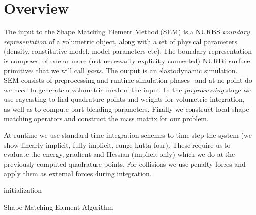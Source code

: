 \section{Overview}
The input to the Shape Matching Element Method (SEM)  is a NURBS \emph{boundary representation} of a volumetric object, along with a set of physical parameters 
(density, constitutive model, model parameters etc). 
The boundary representation is composed of one or more (not necessarily explicit;y connected) NURBS surface primitives that we will call \emph{parts}.
The output is an elastodynamic simulation. 
SEM consists of preprocessing and runtime simulation phases~ and at no point do we need to generate a volumetric mesh of the input. 
In the \emph{preprocessing} stage we use raycasting to find quadrature points and weights for volumetric integration, as well as to compute part blending parameters. 
Finally we construct local shape matching operators and construct the mass matrix for our problem. 

At runtime we use standard time integration schemes to time step the system (we show linearly implicit, fully implicit, runge-kutta four). 
These require us to evaluate the energy, gradient and Hessian (implicit only) which we do at the previously computed quadrature points. 
For collisions we use penalty forces and apply them as external forces during integration.

\begin{algorithm}[h]
    \label{alg:sem}
    \SetAlgoLined
     initialization\;
     \caption{Shape Matching Element Algorithm}
    \end{algorithm}

